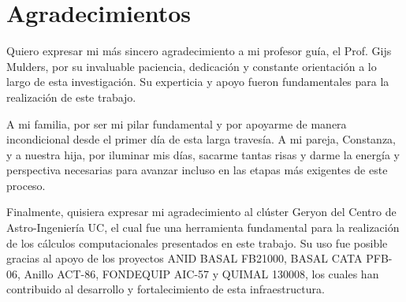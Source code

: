 \chapter*{Agradecimientos}

Quiero expresar mi más sincero agradecimiento a mi profesor guía, el Prof. Gijs Mulders, por su invaluable paciencia, dedicación y constante orientación a lo largo de esta investigación. Su experticia y apoyo fueron fundamentales para la realización de este trabajo.

\vspace{1cm}
A mi familia, por ser mi pilar fundamental y por apoyarme de manera incondicional desde el primer día de esta larga travesía. A mi pareja, Constanza, y a nuestra hija, por iluminar mis días, sacarme tantas risas y darme la energía y perspectiva necesarias para avanzar incluso en las etapas más exigentes de este proceso.

\vspace{1cm}

Finalmente, quisiera expresar mi agradecimiento al clúster Geryon del Centro de Astro-Ingeniería UC, el cual fue una herramienta fundamental para la realización de los cálculos computacionales presentados en este trabajo. Su uso fue posible gracias al apoyo de los proyectos ANID BASAL FB21000, BASAL CATA PFB-06, Anillo ACT-86, FONDEQUIP AIC-57 y QUIMAL 130008, los cuales han contribuido al desarrollo y fortalecimiento de esta infraestructura.